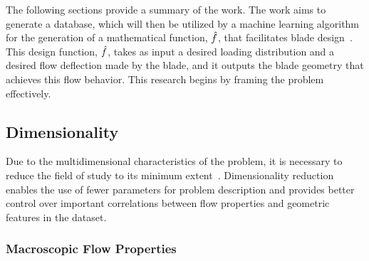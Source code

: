 \documentclass[11pt,a4paper,twocolumn]{article}
\begin{document}

The following sections provide a summary of the work. The work aims to generate a database, which will then be utilized by a machine learning algorithm for the generation of a mathematical function, $\hat{\mathnormal{f}}$, that facilitates blade design~\cite{howard2020deep}. This design function, $\hat{\mathnormal{f}}$, takes as input a desired loading distribution and a desired flow deflection made by the blade, and it outputs the blade geometry that achieves this flow behavior.
This research begins by framing the problem effectively. 

\subsection{Dimensionality}


Due to the multidimensional characteristics of the problem, it is necessary to reduce the field of study to its minimum extent~\cite{clark2019step}. Dimensionality reduction enables the use of fewer parameters for problem description and provides better control over important correlations between flow properties and geometric features in the dataset.

\subsubsection{Macroscopic Flow Properties}


\end{document}
